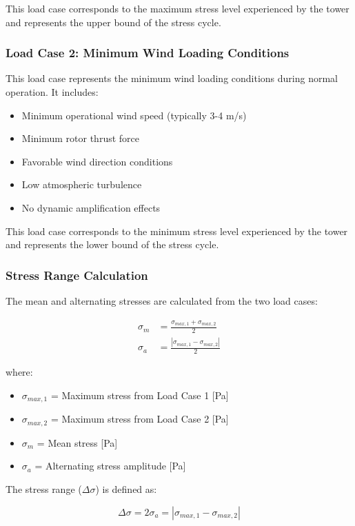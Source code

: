 \documentclass[12pt]{article}
\begin{document}
This load case corresponds to the maximum stress level experienced by the tower and represents the upper bound of the stress cycle.

\subsubsection{Load Case 2: Minimum Wind Loading Conditions}

This load case represents the minimum wind loading conditions during normal operation. It includes:
\begin{itemize}
    \item Minimum operational wind speed (typically 3-4 m/s)
    \item Minimum rotor thrust force
    \item Favorable wind direction conditions
    \item Low atmospheric turbulence
    \item No dynamic amplification effects
\end{itemize}

This load case corresponds to the minimum stress level experienced by the tower and represents the lower bound of the stress cycle.

\subsubsection{Stress Range Calculation}

The mean and alternating stresses are calculated from the two load cases:

\begin{align}
\sigma_m &= \frac{\sigma_{max,1} + \sigma_{max,2}}{2} \\
\sigma_a &= \frac{|\sigma_{max,1} - \sigma_{max,2}|}{2}
\end{align}

where:
\begin{itemize}
    \item $\sigma_{max,1}$ = Maximum stress from Load Case 1 [Pa]
    \item $\sigma_{max,2}$ = Maximum stress from Load Case 2 [Pa]
    \item $\sigma_m$ = Mean stress [Pa]
    \item $\sigma_a$ = Alternating stress amplitude [Pa]
\end{itemize}

The stress range ($\Delta\sigma$) is defined as:

\begin{equation}
\Delta\sigma = 2\sigma_a = |\sigma_{max,1} - \sigma_{max,2}|
\end{equation}
\end{document}
